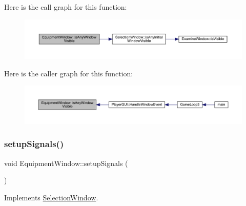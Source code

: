 Here is the call graph for this function\+:
\nopagebreak
\begin{figure}[H]
\begin{center}
\leavevmode
\includegraphics[width=350pt]{d8/dcb/class_equipment_window_a8d311134213a637a7de2d9a3885c716c_cgraph}
\end{center}
\end{figure}
Here is the caller graph for this function\+:
\nopagebreak
\begin{figure}[H]
\begin{center}
\leavevmode
\includegraphics[width=350pt]{d8/dcb/class_equipment_window_a8d311134213a637a7de2d9a3885c716c_icgraph}
\end{center}
\end{figure}
\mbox{\label{class_equipment_window_ae0c437e74fb9e01a5fb0423df76e4665}} 
\subsubsection{\texorpdfstring{setup\+Signals()}{setupSignals()}}
{\footnotesize\ttfamily void Equipment\+Window\+::setup\+Signals (\begin{DoxyParamCaption}{ }\end{DoxyParamCaption})\hspace{0.3cm}{\ttfamily [virtual]}}



Implements \mbox{\hyperlink{class_selection_window_a912063c60bb6c7899422b5d470bcf64e}{Selection\+Window}}.

